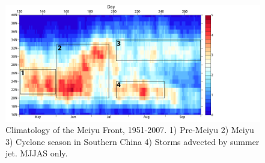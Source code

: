 \documentclass[draft,grl]{AGUTeX}
\begin{document}
\begin{figure}
\noindent\includegraphics[width=36pc]{fig1bmeiyu_climo_mjjas.pdf}
\caption{Climatology of the Meiyu Front, 1951-2007. 1) Pre-Meiyu 2) Meiyu 3) Cyclone season in Southern China 4) Storms advected by summer jet. MJJAS only.}
\label{figure_label}
\end{figure}
\end{document}
